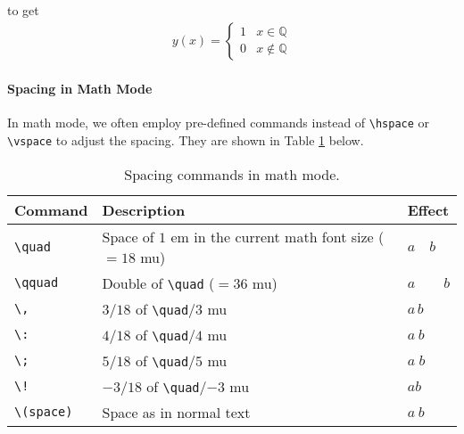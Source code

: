 to get
\begin{equation*}
\begin{aligned}
y(x) = 
\begin{cases}
1 & x \in \mathbb{Q} \\
0 & x \notin \mathbb{Q}
\end{cases}
\end{aligned}
\end{equation*}

\paragraph{Spacing in Math Mode}
In math mode, we often employ pre-defined commands instead of \texttt{\textbackslash hspace} or \texttt{\textbackslash vspace} to adjust the spacing. They are shown in Table \ref{tab:mathspace} below.

\begin{table}[ht!]
\begin{tabularx}{\textwidth}{|p{}|>{\raggedright}p{}|X|}
\hline
Command & Description & Effect \\
\hline
\texttt{\textbackslash quad} & Space of $1$ em in the current math font size ($= 18$ mu) & $a\quad b$ \\
\hline
\texttt{\textbackslash qquad} & Double of \texttt{\textbackslash quad} ($= 36$ mu) & $a\qquad b$ \\
\hline
\texttt{\textbackslash ,} & $3/18$ of \texttt{\textbackslash quad}/$3$ mu & $a\,b$ \\
\hline
\texttt{\textbackslash :} & $4/18$ of \texttt{\textbackslash quad}/$4$ mu & $a\:b$ \\
\hline
\texttt{\textbackslash ;} & $5/18$ of \texttt{\textbackslash quad}/$5$ mu & $a\;b$ \\
\hline
\texttt{\textbackslash !} & $-3/18$ of \texttt{\textbackslash quad}/$-3$ mu & $a\!b$ \\
\hline
\texttt{\textbackslash (space)} & Space as in normal text & $a\ b$ \\
\hline
\end{tabularx}
\caption{Spacing commands in math mode.}
\label{tab:mathspace}
\end{table}

